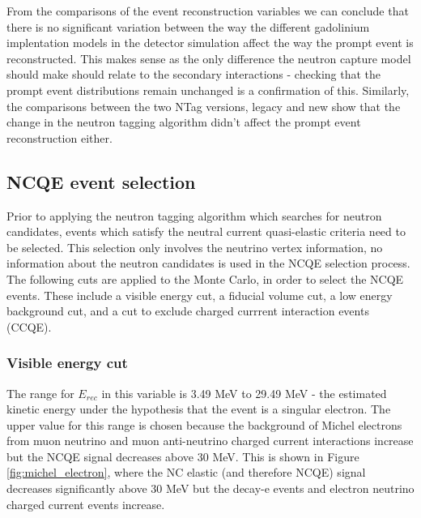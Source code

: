 From the comparisons of the event reconstruction variables we can conclude that there is no significant variation between the way the different gadolinium implentation models in the detector simulation affect the way the prompt event is reconstructed. This makes sense as the only difference the neutron capture model should make should relate to the secondary interactions - checking that the prompt event distributions remain unchanged is a confirmation of this. Similarly, the comparisons between the two NTag versions, legacy and new show that the change in the neutron tagging algorithm didn't affect the prompt event reconstruction either. 


\subsection{NCQE event selection}

Prior to applying the neutron tagging algorithm which searches for neutron candidates, events which satisfy the neutral current quasi-elastic criteria need to be selected. This selection only involves the neutrino vertex information, no information about the neutron candidates is used in the NCQE selection process. 
\newline
The following cuts are applied to the Monte Carlo, in order to select the NCQE events. These include a visible energy cut, a fiducial volume cut, a low energy background cut, and a cut to exclude charged currrent interaction events (CCQE). 

\subsubsection{Visible energy cut}
The range for $E_{rec}$ in this variable is 3.49 MeV to 29.49 MeV - the estimated kinetic energy under the hypothesis that the event is a singular electron. The upper value for this range is chosen because the background of Michel electrons from muon neutrino and muon anti-neutrino charged current interactions increase but the NCQE signal decreases above 30 MeV. This is shown in Figure \ref{fig:michel_electron}, where the NC elastic (and therefore NCQE) signal decreases significantly above 30 MeV but the decay-e events and electron neutrino charged current events increase.


